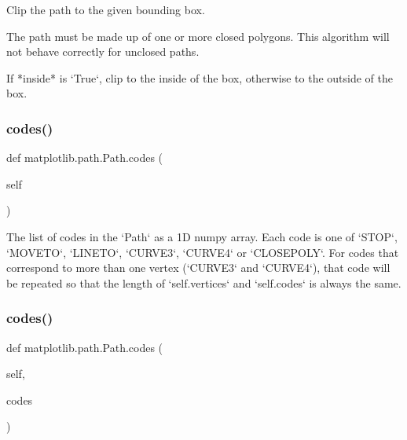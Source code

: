 \begin{DoxyVerb}Clip the path to the given bounding box.

The path must be made up of one or more closed polygons.  This
algorithm will not behave correctly for unclosed paths.

If *inside* is `True`, clip to the inside of the box, otherwise
to the outside of the box.
\end{DoxyVerb}
 \mbox{\label{classmatplotlib_1_1path_1_1Path_aee6db254a0fd529648c4c1d7d427f637}} 
\subsubsection{\texorpdfstring{codes()}{codes()}\hspace{0.1cm}{\footnotesize\ttfamily [1/2]}}
{\footnotesize\ttfamily def matplotlib.\+path.\+Path.\+codes (\begin{DoxyParamCaption}\item[{}]{self }\end{DoxyParamCaption})}

\begin{DoxyVerb}The list of codes in the `Path` as a 1D numpy array.  Each
code is one of `STOP`, `MOVETO`, `LINETO`, `CURVE3`, `CURVE4`
or `CLOSEPOLY`.  For codes that correspond to more than one
vertex (`CURVE3` and `CURVE4`), that code will be repeated so
that the length of `self.vertices` and `self.codes` is always
the same.
\end{DoxyVerb}
 \mbox{\label{classmatplotlib_1_1path_1_1Path_ae94bddf115167ef56631291d82946e5e}} 
\subsubsection{\texorpdfstring{codes()}{codes()}\hspace{0.1cm}{\footnotesize\ttfamily [2/2]}}
{\footnotesize\ttfamily def matplotlib.\+path.\+Path.\+codes (\begin{DoxyParamCaption}\item[{}]{self,  }\item[{}]{codes }\end{DoxyParamCaption})}

